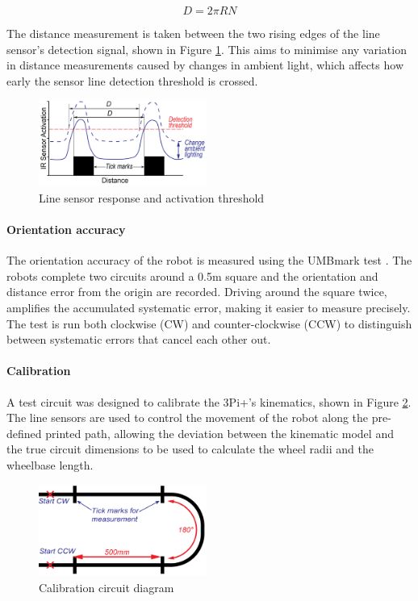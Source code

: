 \documentclass[conference]{IEEEtran}
\begin{document}
\begin{equation}
    D = 2 \pi R N
\end{equation}

The distance measurement is taken between the two rising edges of the line sensor's detection signal, shown in Figure \ref{fig:linesensor}.
This aims to minimise any variation in distance measurements caused by changes in ambient light, which affects how early the sensor line detection threshold is crossed.

\begin{figure}[h!]
    \centering
    \includegraphics[width = 0.49\textwidth]{img/linesensor_response.png}
    \caption{Line sensor response and activation threshold}
    \label{fig:linesensor}
\end{figure}

\paragraph{Orientation accuracy}
The orientation accuracy of the robot is measured using the UMBmark test \cite{UMBmark}. 
The robots complete two circuits around a 0.5m square and the orientation and distance error from the origin are recorded.
Driving around the square twice, amplifies the accumulated systematic error, making it easier to measure precisely. 
The test is run both clockwise (CW) and counter-clockwise (CCW) to distinguish between systematic errors that cancel each other out.

\paragraph{Calibration}
A test circuit was designed to calibrate the 3Pi+’s kinematics, shown in Figure \ref{fig:calibration_circuit}. 
The line sensors are used to control the movement of the robot along the pre-defined printed path, allowing the deviation between the kinematic model and the true circuit dimensions to be used to calculate the wheel radii and the wheelbase length.

\begin{figure}[h!]
    \centering
    \includegraphics[width = 0.49\textwidth]{img/calibration_circuit.png}
    \caption{Calibration circuit diagram}
    \label{fig:calibration_circuit}
\end{figure}
\end{document}
